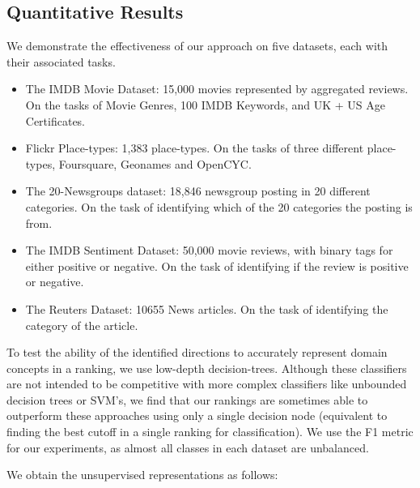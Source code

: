 \documentclass{article}
\begin{document}
\subsection{Quantitative Results}
We demonstrate the effectiveness of our approach on five datasets, each with their associated tasks.
\begin{itemize} %
  \item The IMDB Movie Dataset: 15,000 movies represented by aggregated reviews. On the tasks of Movie Genres, 100 IMDB Keywords, and UK + US Age Certificates.
  \item Flickr Place-types: 1,383 place-types. On the tasks of three different place-types, Foursquare, Geonames and OpenCYC.
  \item The 20-Newsgroups dataset: 18,846 newsgroup posting in 20 different categories. On the task of identifying which of the 20 categories the posting is from.
  \item The IMDB Sentiment Dataset: 50,000 movie reviews, with binary tags for either positive or negative. On the task of identifying if the review is positive or negative.
  \item The Reuters Dataset: 10655 News articles. On the task of identifying the category of the article.
\end{itemize}
 To test the ability of the identified directions to accurately represent domain concepts in a ranking, we use low-depth decision-trees. Although these classifiers are not intended to be competitive with more complex classifiers like unbounded decision trees or SVM's, we find that our rankings are sometimes able to outperform these approaches using only a single decision node (equivalent to finding the best cutoff in a single ranking for classification). We use the F1 metric for our experiments, as almost all classes in each dataset are unbalanced. 
 
 
 We obtain the unsupervised representations as follows:
 
\end{document}
